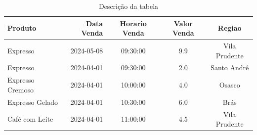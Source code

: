 \begin{table}[!ht]

	\centering
	\caption{Descrição da tabela}
	\label{tab:tab_identificador}
	\begin{tabular*}{\columnwidth}{@{\extracolsep{\fill}}lrccc@{}}
		\toprule[1pt]{}\textbf {Produto} & \textbf{Data Venda} & \textbf{Horario Venda} & \textbf{Valor Venda} & \textbf{Regiao}\\\hline

		Expresso		  & 2024-05-08	     & 09:30:00	    & 9.9 & Vila Prudente	\\
		Expresso		  & 2024-04-01	     & 09:30:00     & 2.0 & Santo André	\\
		Expresso Cremoso  & 2024-04-01		 & 10:00:00		& 4.0 & Osasco	\\
		Expresso Gelado	  & 2024-04-01		 & 10:30:00	 	& 6.0 & Brás	\\
		Café com Leite	  & 2024-04-01		 & 11:00:00		& 4.5 & Vila Prudente	\\
		\bottomrule[1pt]
	\end{tabular*}
 
	\raggedright
	 \\%
\end{table}\\ \\ \\ \\ \\ \\ \\ \\ \\ \\ \\ \\ \\ \\ \\ \\ \\ \\ \\ \\ \\ \\



